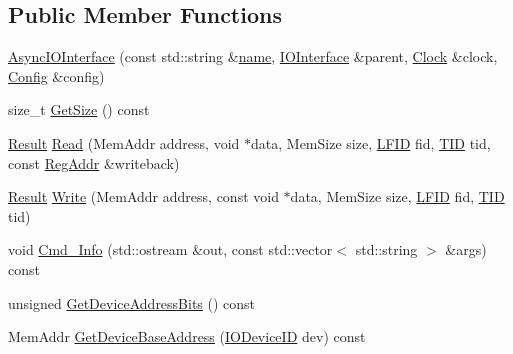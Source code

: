 \subsection*{Public Member Functions}
\begin{DoxyCompactItemize}
\item 
\hyperlink{class_simulator_1_1drisc_1_1_i_o_interface_1_1_async_i_o_interface_a464b5fb822aca2d8056168d652a1958a}{Async\+I\+O\+Interface} (const std\+::string \&\hyperlink{mtconf_8c_a8f8f80d37794cde9472343e4487ba3eb}{name}, \hyperlink{class_simulator_1_1drisc_1_1_i_o_interface}{I\+O\+Interface} \&parent, \hyperlink{class_simulator_1_1_clock}{Clock} \&clock, \hyperlink{class_config}{Config} \&config)
\item 
size\+\_\+t \hyperlink{class_simulator_1_1drisc_1_1_i_o_interface_1_1_async_i_o_interface_accc074c35d15dc854b5124fd10a1b471}{Get\+Size} () const 
\item 
\hyperlink{namespace_simulator_a4b6b5616e7236c0c131516a441776805}{Result} \hyperlink{class_simulator_1_1drisc_1_1_i_o_interface_1_1_async_i_o_interface_addc263b5e5f191da3a63279a18ddf3ff}{Read} (Mem\+Addr address, void $\ast$data, Mem\+Size size, \hyperlink{namespace_simulator_aaccbc706b2d6c99085f52f6dfc2333e4}{L\+F\+I\+D} fid, \hyperlink{namespace_simulator_a483cc4ecee1736e895054617672cded5}{T\+I\+D} tid, const \hyperlink{struct_simulator_1_1_reg_addr}{Reg\+Addr} \&writeback)
\item 
\hyperlink{namespace_simulator_a4b6b5616e7236c0c131516a441776805}{Result} \hyperlink{class_simulator_1_1drisc_1_1_i_o_interface_1_1_async_i_o_interface_aadb2d48c24ed209ee89b5306f49afdb1}{Write} (Mem\+Addr address, const void $\ast$data, Mem\+Size size, \hyperlink{namespace_simulator_aaccbc706b2d6c99085f52f6dfc2333e4}{L\+F\+I\+D} fid, \hyperlink{namespace_simulator_a483cc4ecee1736e895054617672cded5}{T\+I\+D} tid)
\item 
void \hyperlink{class_simulator_1_1drisc_1_1_i_o_interface_1_1_async_i_o_interface_adc1c6e47d6ee7a0114f656c2213b209a}{Cmd\+\_\+\+Info} (std\+::ostream \&out, const std\+::vector$<$ std\+::string $>$ \&args) const 
\item 
unsigned \hyperlink{class_simulator_1_1drisc_1_1_i_o_interface_1_1_async_i_o_interface_aa56c4302a9e067d1c2c6969ffe581aeb}{Get\+Device\+Address\+Bits} () const 
\item 
Mem\+Addr \hyperlink{class_simulator_1_1drisc_1_1_i_o_interface_1_1_async_i_o_interface_a74deaca54a0584c29dd28b814246f3a7}{Get\+Device\+Base\+Address} (\hyperlink{namespace_simulator_a3493d987c866ad6b8aaa704c42502db0}{I\+O\+Device\+I\+D} dev) const 
\end{DoxyCompactItemize}


